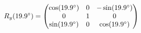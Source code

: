 \documentclass[preview]{standalone}
\begin{document}
\begin{align*}
\special{dvisvgm:raw <g id='unique000'>}R_y(19.9^\circ) = \begin{pmatrix} \cos(19.9^\circ) & 0 & -\sin(19.9^\circ) \\ 0 & 1 & 0 \\ \sin(19.9^\circ) & 0 & \cos(19.9^\circ) \end{pmatrix}\special{dvisvgm:raw </g>}
\end{align*}
\end{document}
